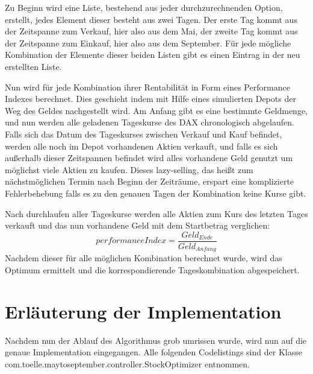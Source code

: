 \documentclass[12pt, a4paper, titlepage]{report}
\begin{document}
            Zu Beginn wird eine Liste, bestehend aus jeder durchzurechnenden Option,
            erstellt, jedes Element dieser besteht aus zwei Tagen. Der erste Tag 
            kommt aus der Zeitspanne zum Verkauf, hier also aus dem Mai, der zweite
            Tag kommt aus der Zeitspanne zum Einkauf, hier also aus dem September.
            Für jede mögliche Kombination der Elemente dieser beiden Listen gibt es
            einen Eintrag in der neu erstellten Liste.

            Nun wird für jede Kombination ihrer Rentabilität in Form eines
            Performance Indexes berechnet. Dies geschieht indem mit Hilfe eines
            simulierten Depots der Weg des Geldes nachgestellt wird.
            Am Anfang gibt es eine bestimmte Geldmenge, und nun werden alle
            geladenen Tageskurse des DAX chronologisch abgelaufen.
            Falls sich das Datum des Tageskurses zwischen Verkauf
            und Kauf befindet, werden alle noch im Depot vorhandenen Aktien
            verkauft, und falls es sich außerhalb dieser Zeitspannen befindet
            wird alles vorhandene Geld genutzt um möglichst viele Aktien zu
            kaufen. Dieses lazy-selling, das heißt zum nächstmöglichen Termin nach
            Beginn der Zeiträume, erspart eine komplizierte Fehlerbehebung falls
            es zu den genauen Tagen der Kombination keine Kurse gibt.

            Nach durchlaufen aller Tageskurse werden alle Aktien zum Kurs des
            letzten Tages verkauft und das nun vorhandene Geld mit dem
            Startbetrag verglichen:
            \begin{equation}
                performanceIndex = \frac{Geld_{Ende}}{Geld_{Anfang}}
            \end{equation}
            Nachdem dieser für alle möglichen Kombination berechnet wurde, wird
            das Optimum ermittelt und die korrespondierende Tageskombination
            abgespeichert.

        \section{Erläuterung der Implementation}
            Nachdem nun der Ablauf des Algorithmus grob umrissen wurde, wird nun
            auf die genaue Implementation eingegangen. Alle folgenden Codelistings
            sind der Klasse com.toelle.maytoseptember.controller.StockOptimizer entnommen.
            
            
\end{document}

